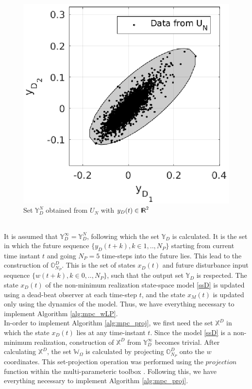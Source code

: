 \documentclass[letterpaper, 10 pt, conference]{ieeeconf}  %
\newcommand*{\RR}{%
	\textsf{I\kern-.3ex R}%
}
\begin{document}
	\begin{figure}[h]
		\hspace{30pt}
		\includegraphics[scale=0.7]{Y_D_set.eps}
		\caption{Set $\mathbb{Y}_D^N$ obtained from $U_N$ with $y_D(t) \in \RR^{2}$}
		\label{Y_D^inf}
	\end{figure} 
	\vspace{-5pt}
\\ \indent
It is assumed that $\mathbb{Y}_D^{\infty}=\mathbb{Y}_D^N$, following which the set $\mathbb{Y}_D$ is calculated. It is the set in which the future sequence $\{y_D(t+k),k \in 1,..,N_P\}$ starting from current time instant $t$ and going $N_P=5$ time-steps into the future lies. This lead to the construction of $\mathbb{O}_{N_P}^D$. This is the set of states $x_D(t)$ and future disturbance input sequence $\{w(t+k),k \in 0,..,N_P\}$, such that the output set $\mathbb{Y}_D$ is respected. The state $x_D(t)$ of the non-minimum realization state-space model \eqref{ssD} is updated using a dead-beat observer at each time-step $t$, and the state $x_M(t)$ is updated only using the dynamics of the model. Thus, we have everything necessary to implement Algorithm \ref{alg:mpc_wLP}.
\\
\indent
In-order to implement Algorithm \ref{alg:mpc_proj}, we first need the set $\mathbb{X}^D$ in which the state $x_D(t)$ lies at any time-instant $t$. Since the model \eqref{ssD} is a non-minimum realization, construction of $\mathbb{X}^D$ from $\mathbb{Y}_D^{\infty}$ becomes trivial. After calculating $\mathbb{X}^D$, the set $\mathbb{W}_{\Omega}$ is calculated by projecting $\mathbb{O}_{N_P}^D$ onto the $w$ coordinates. This set-projection operation was performed using the $projection$ function within the multi-parameteric toolbox \cite{mpt}. Following this, we have everything necessary to implement Algorithm \ref{alg:mpc_proj}.
\end{document}

